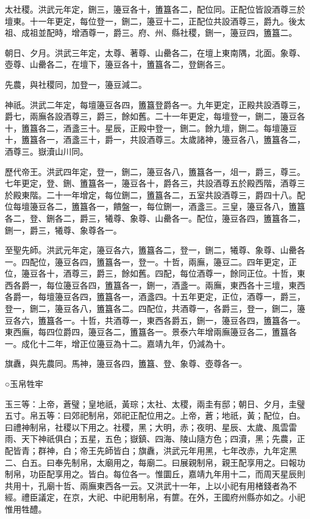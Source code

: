 太社稷。洪武元年定，鉶三，籩豆各十，簠簋各二，配位同。正配位皆設酒尊三於壇東。十一年更定，每位登一，鉶二，籩豆十二，正配位共設酒尊三，爵九。後太祖、成祖並配時，增酒尊一，爵三。府、州、縣社稷，鉶一，籩豆四，簠簋二。

朝日、夕月。洪武三年定，太尊、著尊、山罍各二，在壇上東南隅，北面。象尊、壺尊、山罍各二，在壇下，籩豆各十，簠簋各二，登鉶各三。

先農，與社稷同，加登一，籩豆減二。

神祇。洪武二年定，每壇籩豆各四，簠簋登爵各一。九年更定，正殿共設酒尊三，爵七，兩廡各設酒尊三，爵三，餘如舊。二十一年更定，每壇登一，鉶二，籩豆各十，簠簋各二，酒盞三十。星辰，正殿中登一，鉶二。餘九壇，鉶二。每壇籩豆十，簠簋各一，酒盞三十，爵一，共設酒尊三。太歲諸神，籩豆各八，簠簋各二，酒尊三。嶽瀆山川同。

歷代帝王。洪武四年定，登一，鉶二，籩豆各八，簠簋各一，俎一，爵三，尊三。七年更定，登、鉶、簠簋各一，籩豆各十，爵各三，共設酒尊五於殿西階，酒尊三於殿東階。二十一年增定，每位鉶二，簠簋各二，五室共設酒尊三，爵四十八。配位每壇籩豆各二，簠簋各一，饋盤一，每位鉶一，酒盞三。三皇，籩豆各八，簠簋各二，登、鉶各二，爵三，犧尊、象尊、山罍各一。配位，籩豆各四，簠簋各二，鉶一，爵三，犧尊、象尊各一。

至聖先師。洪武元年定，籩豆各六，簠簋各二，登一，鉶二，犧尊、象尊、山罍各一。四配位，籩豆各四，簠簋各一，登一。十哲，兩廡，籩豆二。四年更定，正位，籩豆各十，酒尊三，爵三，餘如舊。四配，每位酒尊一，餘同正位。十哲，東西各爵一，每位籩豆各四，簠簋各一，鉶一，酒盞一。兩廡，東西各十三壇，東西各爵一，每壇籩豆各四，簠簋各一，酒盞四。十五年更定，正位，酒尊一，爵三，登一，鉶二，籩豆各八，簠簋各二。四配位，共酒尊一，各爵三，登一，鉶二，籩豆各六，簠簋各一。十哲，共酒尊一，東西各爵五，鉶一，籩豆各四，簠簋各一。東西廡，每四位爵四，籩豆各二，簠簋各一。景泰六年增兩廡籩豆各二，簠簋各一。成化十二年，增正位籩豆為十二。嘉靖九年，仍減為十。

旗纛，與先農同。馬神，籩豆各四，簠簋、登、象尊、壺尊各一。

○玉帛牲牢

玉三等：上帝，蒼璧；皇地祇，黃琮；太社、太稷，兩圭有邸；朝日、夕月，圭璧五寸。帛五等：曰郊祀制帛，郊祀正配位用之。上帝，蒼；地祇，黃；配位，白。曰禮神制帛，社稷以下用之。社稷，黑；大明，赤；夜明、星辰、太歲、風雲雷雨、天下神祇俱白；五星，五色；嶽鎮、四海、陵山隨方色；四瀆，黑；先農，正配皆青；群神，白；帝王先師皆白；旗纛，洪武元年用黑，七年改赤，九年定黑二、白五。曰奉先制帛，太廟用之，每廟二。曰展親制帛，親王配享用之。曰報功制帛，功臣配享用之。皆白。每位各一。惟圜丘，嘉靖九年用十二，而周天星辰則共用十，孔廟十哲、兩廡東西各一云。又洪武十一年，上以小祀有用楮錢者為不經。禮臣議定，在京，大祀、中祀用制帛，有篚。在外，王國府州縣亦如之。小祀惟用牲醴。

